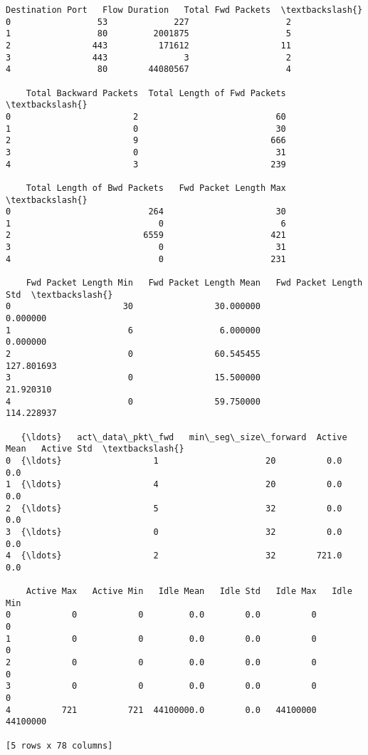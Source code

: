 \documentclass[11pt]{article}
\makeatletter
\newcommand{\boxspacing}{\kern\kvtcb@left@rule\kern\kvtcb@boxsep}
\newcommand{\prompt}[4]{
        \ttfamily\llap{{\color{#2}[#3]:\hspace{3pt}#4}}\vspace{-\baselineskip}
    }
\makeatother
\begin{document}
            \begin{tcolorbox}[breakable, size=fbox, boxrule=.5pt, pad at break*=1mm, opacityfill=0]
\prompt{Out}{outcolor}{14}{\boxspacing}
\begin{Verbatim}[commandchars=\\\{\}]
    Destination Port   Flow Duration   Total Fwd Packets  \textbackslash{}
0                 53             227                   2
1                 80         2001875                   5
2                443          171612                  11
3                443               3                   2
4                 80        44080567                   4

    Total Backward Packets  Total Length of Fwd Packets  \textbackslash{}
0                        2                           60
1                        0                           30
2                        9                          666
3                        0                           31
4                        3                          239

    Total Length of Bwd Packets   Fwd Packet Length Max  \textbackslash{}
0                           264                      30
1                             0                       6
2                          6559                     421
3                             0                      31
4                             0                     231

    Fwd Packet Length Min   Fwd Packet Length Mean   Fwd Packet Length Std  \textbackslash{}
0                      30                30.000000                0.000000
1                       6                 6.000000                0.000000
2                       0                60.545455              127.801693
3                       0                15.500000               21.920310
4                       0                59.750000              114.228937

   {\ldots}   act\_data\_pkt\_fwd   min\_seg\_size\_forward  Active Mean   Active Std  \textbackslash{}
0  {\ldots}                  1                     20          0.0          0.0
1  {\ldots}                  4                     20          0.0          0.0
2  {\ldots}                  5                     32          0.0          0.0
3  {\ldots}                  0                     32          0.0          0.0
4  {\ldots}                  2                     32        721.0          0.0

    Active Max   Active Min   Idle Mean   Idle Std   Idle Max   Idle Min
0            0            0         0.0        0.0          0          0
1            0            0         0.0        0.0          0          0
2            0            0         0.0        0.0          0          0
3            0            0         0.0        0.0          0          0
4          721          721  44100000.0        0.0   44100000   44100000

[5 rows x 78 columns]
\end{Verbatim}
\end{tcolorbox}
        
\end{document}

